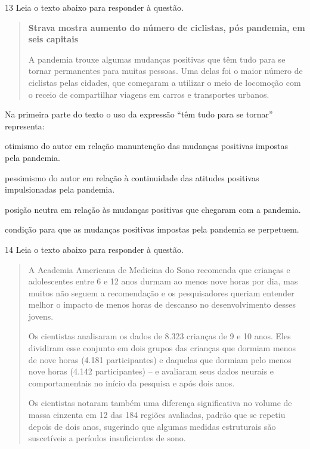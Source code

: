 \num{13} Leia o texto abaixo para responder à questão. 

\begin{quote}

\textbf{Strava mostra aumento do número de ciclistas, pós pandemia, em
seis capitais}

A pandemia trouxe algumas mudanças positivas que têm tudo para se tornar
permanentes para muitas pessoas. Uma delas foi o maior número de
ciclistas pelas cidades, que começaram a utilizar o meio de locomoção
com o receio de compartilhar viagens em carros e transportes urbanos.

\end{quote}


Na primeira parte do texto o uso da expressão ``têm tudo para se
tornar'' representa:

\begin{escolha}

    \item otimismo do autor em relação manuntenção das mudanças positivas
  impostas pela pandemia.

    \item pessimismo do autor em relação à continuidade das atitudes
  positivas impulsionadas pela pandemia.

    \item posição neutra em relação às mudanças positivas que chegaram com a
  pandemia.

    \item condição para que as mudanças positivas impostas pela pandemia se
  perpetuem.

\end{escolha}

\num{14} Leia o texto abaixo para responder à questão. 

\begin{quote}

A Academia Americana de Medicina do Sono recomenda que crianças e
adolescentes entre 6 e 12 anos durmam ao menos nove horas por dia, mas
muitos não seguem a recomendação e os pesquisadores queriam entender
melhor o impacto de menos horas de descanso no desenvolvimento desses
jovens.

Os cientistas analisaram os dados de 8.323 crianças de 9 e 10 anos. Eles
dividiram esse conjunto em dois grupos das crianças que dormiam menos de
nove horas (4.181 participantes) e daquelas que dormiam pelo menos nove
horas (4.142 participantes) -- e avaliaram seus dados neurais e
comportamentais no início da pesquisa e após dois anos.

Os cientistas notaram também uma diferença significativa no volume de
massa cinzenta em 12 das 184 regiões avaliadas, padrão que se repetiu
depois de dois anos, sugerindo que algumas medidas estruturais são
suscetíveis a períodos insuficientes de sono.

\end{quote}

